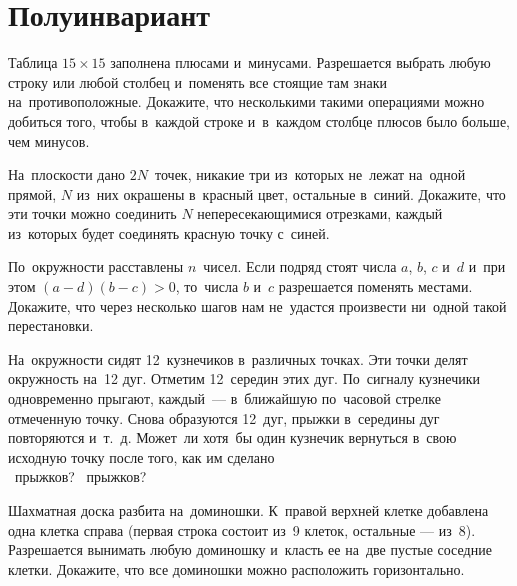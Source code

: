 
\section*{Полуинвариант}


\begin{problems}

\item
Таблица $15 \times 15$ заполнена плюсами и~минусами.
Разрешается выбрать любую строку или любой столбец и~поменять все стоящие там
знаки на~противоположные.
Докажите, что несколькими такими операциями можно добиться того, чтобы в~каждой
строке и~в~каждом столбце плюсов было больше, чем минусов.

\item
На~плоскости дано $2 N$~точек, никакие три из~которых не~лежат на~одной прямой,
$N$ из~них окрашены в~красный цвет, остальные в~синий.
Докажите, что эти точки можно соединить $N$ непересекающимися отрезками, каждый
из~которых будет соединять красную точку с~синей.

\item
По~окружности расставлены $n$~чисел.
Если подряд стоят числа $a$, $b$, $c$ и~$d$ и~при этом $(a - d) (b - c) > 0$,
то~числа $b$ и~$c$ разрешается поменять местами.
Докажите, что через несколько шагов нам не~удастся произвести ни~одной такой
перестановки.

\item
На~окружности сидят 12~кузнечиков в~различных точках.
Эти точки делят окружность на~12 дуг.
Отметим 12~середин этих дуг.
По~сигналу кузнечики одновременно прыгают, каждый~--- в~ближайшую по~часовой
стрелке отмеченную точку.
Снова образуются 12~дуг, прыжки в~середины дуг повторяются и~т.~д.
Может~ли хотя~бы один кузнечик вернуться в~свою исходную точку после того, как
им сделано
\\
~прыжков?
\qquad
{}~прыжков?

\item
Шахматная доска разбита на~доминошки.
К~правой верхней клетке добавлена одна клетка справа
(первая строка состоит из~9 клеток, остальные — из~8).
Разрешается вынимать любую доминошку и~класть ее на~две пустые соседние клетки.
Докажите, что все доминошки можно расположить горизонтально.

\end{problems}

